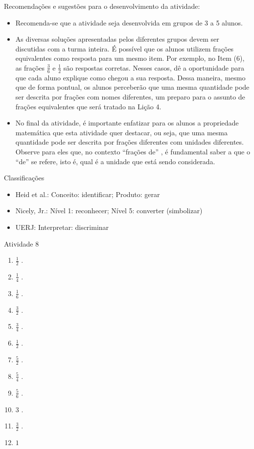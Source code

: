 \documentclass[oneside]{book}
\begin{document}
\begin{multicols}{2}
  Recomendações e sugestões para o desenvolvimento da atividade:
\begin{itemize} %
    \item       Recomenda-se que a atividade seja desenvolvida em grupos de 3 a 5 alunos.
    \item       As diversas soluções apresentadas pelos diferentes grupos devem ser discutidas com a turma inteira. É possível que os alunos utilizem frações equivalentes como resposta para um mesmo item. Por exemplo, no Item (6), as frações       $\frac{3}{6}$       e       $\frac{1}{2}$       são respostas corretas. Nesses casos, dê a oportunidade para que cada aluno explique como chegou a sua resposta. Dessa maneira, mesmo que de forma pontual, os alunos perceberão que uma mesma quantidade pode ser descrita por frações com nomes diferentes, um preparo para o assunto de frações equivalentes que será tratado na Lição 4.
    \item       No final da atividade, é importante enfatizar para os alunos a propriedade matemática que esta atividade quer destacar, ou seja, que uma mesma quantidade pode ser descrita por frações diferentes com unidades diferentes. Observe para eles que, no contexto       ``frações de''      , é fundamental saber a que o       ``de''       se refere, isto é, qual é a unidade que está sendo considerada.
\end{itemize} %


  Classificações
\begin{itemize} %
    \item       Heid et al.: Conceito: identificar; Produto: gerar
    \item       Nicely, Jr.: Nível 1: reconhecer; Nível 5: converter (simbolizar)
    \item       UERJ: Interpretar: discriminar
\end{itemize} %



\begin{resposta*}{Atividade 8}
\begin{enumerate} [\quad a)] %
    \item             $\frac{1}{2}$      .
    \item             $\frac{1}{4}$      .
    \item             $\frac{1}{6}$      .
    \item             $\frac{3}{2}$      .
    \item             $\frac{3}{4}$      .
    \item             $\frac{1}{2}$      .
    \item             $\frac{5}{2}$      .
    \item             $\frac{5}{4}$      .
    \item             $\frac{5}{6}$      .
    \item             $3$      .
    \item             $\frac{3}{2}$      .
    \item             $1$
\end{enumerate} %


\end{resposta*}
\end{multicols}
\end{document}

